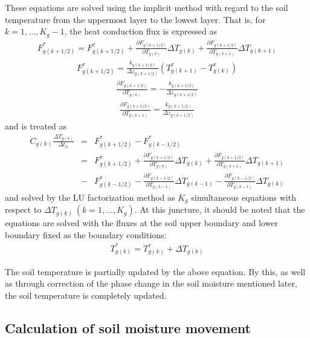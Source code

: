 These equations are solved using the implicit method with regard to the soil temperature from the uppermost layer to the lowest layer. That is, for \(k=1,\ldots,K_g-1\), the heat conduction flux is
expressed as \begin{eqnarray}
  F_{g(k+1/2)}^{\ast} = F_{g(k+1/2)}^{\tau}
+\frac{\partial {F}_{g(k+1/2)}}{\partial T_{g(k)}}
 \Delta T_{g(k)}
+\frac{\partial {F}_{g(k+1/2)}}{\partial T_{g(k+1)}}
 \Delta T_{g(k+1)}
\end{eqnarray} \begin{eqnarray}
  F_{g(k+1/2)}^{\tau} =
\frac{k_{g(k+1/2)}}{\Delta z_{g(k+1/2)}}(T_{g(k+1)}^{\tau} - T_{g(k)}^{\tau})
\end{eqnarray} \begin{eqnarray}
 \frac{\partial {F}_{g(k+1/2)}}{\partial T_{g(k)}} =
- \frac{k_{g(k+1/2)}}{\Delta z_{g(k+1/2)}}
\end{eqnarray} \begin{eqnarray}
 \frac{\partial {F}_{g(k+1/2)}}{\partial T_{g(k+1)}} =
\frac{k_{g(k+1/2)}}{\Delta z_{g(k+1/2)}}
\end{eqnarray} and \hyperref[eq289]{} is treated as \begin{eqnarray}
C_{g(k)} \frac{\Delta T_{g(k)}}{\Delta t_L}
&=& F_{g(k+1/2)}^\ast - {F}_{g(k-1/2)}^\ast  \nonumber\\
&=& {F}_{g(k+1/2)}^{\tau}
+\frac{\partial F_{g(k+1/2)}}{\partial T_{g(k)}}
 \Delta T_{g(k)}
+\frac{\partial F_{g(k+1/2)}}{\partial T_{g(k+1)}}
 \Delta T_{g(k+1)}  \nonumber\\
&-& F_{g(k-1/2)}^{\tau}
-\frac{\partial F_{g(k-1/2)}}{\partial T_{g(k-1)}}
 \Delta T_{g(k-1)}
-\frac{\partial F_{g(k-1/2)}}{\partial T_{g(k-1)}}
 \Delta T_{g(k)}
\end{eqnarray} and solved by the LU factorization method as \(K_{g}\) simultaneous equations with respect to \(\Delta T_{g(k)}\ (k=1,\ldots,K_{g})\). At this juncture, it should be noted that the equations are
solved with the fluxes at the soil upper boundary and lower boundary fixed as the boundary conditions: \begin{eqnarray}
 T_{g(k)}^\ast = T_{g(k)}^{\tau} + \Delta T_{g(k)}
\end{eqnarray}

The soil temperature is partially updated by the above equation. By this, as well as through correction of the phase change in the soil moisture mentioned later, the soil temperature is completely
updated.

\subsection{Calculation of soil moisture movement}\label{calculation-of-soil-moisture-movement}

